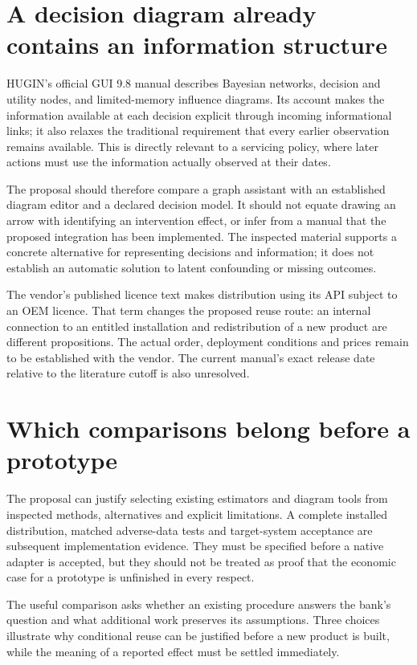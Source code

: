 \section{A decision diagram already contains an information structure}
HUGIN's official GUI 9.8 manual describes Bayesian networks, decision and
utility nodes, and limited-memory influence diagrams. Its account makes
the information available at each decision explicit through incoming
informational links; it also relaxes the traditional requirement that every
earlier observation remains available. This is directly relevant to a
servicing policy, where later actions must use the information actually
observed at their dates. \citep{gap29hugin}

The proposal should therefore compare a graph assistant with an established
diagram editor and a declared decision model. It should not equate drawing
an arrow with identifying an intervention effect, or infer from a manual
that the proposed integration has been implemented. The inspected material
supports a concrete alternative for representing decisions and information;
it does not establish an automatic solution to latent confounding or missing
outcomes.

The vendor's published licence text makes distribution using its API subject
to an OEM licence. That term changes the proposed reuse route: an internal
connection to an entitled installation and redistribution of a new product
are different propositions. The actual order, deployment conditions and
prices remain to be established with the vendor. The current manual's exact
release date relative to the literature cutoff is also unresolved.
\citep{gap29huginlicense}

\section{Which comparisons belong before a prototype}
The proposal can justify selecting existing estimators and diagram tools
from inspected methods, alternatives and explicit limitations. A complete
installed distribution, matched adverse-data tests and target-system
acceptance are subsequent implementation evidence. They must be specified
before a native adapter is accepted, but they should not be treated as
proof that the economic case for a prototype is unfinished in every respect.

The useful comparison asks whether an existing procedure answers the bank's
question and what additional work preserves its assumptions. Three choices
illustrate why conditional reuse can be justified before a new product is
built, while the meaning of a reported effect must be settled immediately.

